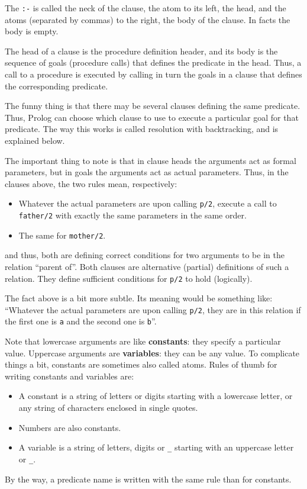 The \verb+:-+ is called the neck of the clause, the atom to its
left, the head, and the atoms (separated by commas) to the right, the
body of the clause. In facts the body is empty.

The head of a clause is the procedure definition header, and its body
is the sequence of goals (procedure calls) that defines the predicate
in the head. Thus, a call to a procedure is executed by calling in
turn the goals in a clause that defines the corresponding predicate.

The funny thing is that there may be several clauses defining the same
predicate. Thus, Prolog can choose which clause to use to execute a
particular goal for that predicate. The way this works is called
resolution with backtracking, and is explained below.

The important thing to note is that in clause heads the arguments act
as formal parameters, but in goals the arguments act as actual
parameters. Thus, in the clauses above, the two rules mean,
respectively:
\begin{itemize}
\item Whatever the actual parameters are upon calling \verb+p/2+,
  execute a call to \verb+father/2+ with exactly the same parameters in
  the same order.
\item The same for \verb+mother/2+.
\end{itemize}
%
and thus, both are defining correct conditions for two arguments to be
in the relation ``parent of''. Both clauses are alternative (partial)
definitions of such a relation. They define sufficient conditions for
\verb+p/2+ to hold (logically).

The fact above is a bit more subtle. Its meaning would be something
like: ``Whatever the actual parameters are upon calling \verb+p/2+,
they are in this relation if the first one is \verb+a+ and the second
one is \verb+b+''.

Note that lowercase arguments are like {\bf constants}: they specify a
particular value. Uppercase arguments are {\bf variables}: they can be any
value. To complicate things a bit, constants are sometimes also called
atoms. Rules of thumb for writing constants and variables are:
\begin{itemize}
\item A constant is a string of letters or digits starting with a
  lowercase letter, or any string of characters enclosed in single
  quotes. 
\item Numbers are also constants.
\item A variable is a string of letters, digits or \verb+_+ starting
  with an uppercase letter or \verb+_+.
\end{itemize}
%
By the way, a predicate name is written with the same rule than for
constants.

